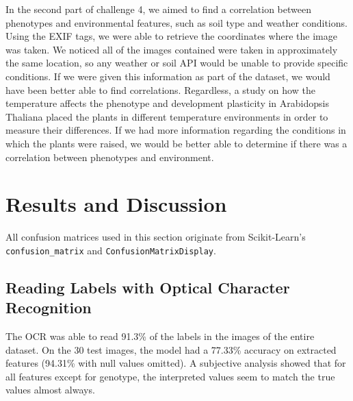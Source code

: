 \documentclass[final,5p,times,twocolumn,authoryear]{elsarticle}
\begin{document}
In the second part of challenge 4, we aimed to find a correlation between phenotypes and environmental features, such as soil type and weather conditions. Using the EXIF tags, we were able to retrieve the coordinates where the image was taken. We noticed all of the images contained were taken in approximately the same location, so any weather or soil API would be unable to provide specific conditions. If we were given this information as part of the dataset, we would have been better able to find correlations. Regardless, a study on how the temperature affects the phenotype and development plasticity in Arabidopsis Thaliana \citep{ibanez2017ambient} placed the plants in different temperature environments in order to measure their differences. If we had more information regarding the conditions in which the plants were raised, we would be better able to determine if there was a correlation between phenotypes and environment.


\section{Results and Discussion}
\label{results}

All confusion matrices used in this section originate from Scikit-Learn's \verb|confusion_matrix| and \verb|ConfusionMatrixDisplay|.

\subsection{Reading Labels with Optical Character Recognition}
\label{step_1}

The OCR was able to read 91.3\% of the labels in the images of the entire dataset. On the 30 test images, the model had a 77.33\% accuracy on extracted features (94.31\% with null values omitted). A subjective analysis showed that for all features except for genotype, the interpreted values seem to match the true values almost always.

\begin{center}
\label{Table1}
\end{center}
\end{document}
